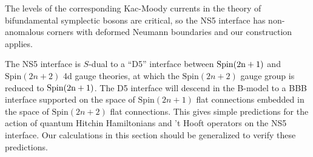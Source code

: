 \documentclass[11pt,a4paper]{article}
\begin{document}
The levels of the corresponding Kac-Moody currents in the theory of bifundamental symplectic bosons are critical, so the NS5 interface 
has non-anomalous corners with deformed Neumann boundaries and our construction applies. 

The NS5 interface is $S$-dual to a ``D5'' interface between $\mathrm{{\mathrm{Spin}}(2n+1)}$ and $\mathrm{Spin}(2n+2)$ 4d gauge theories,
at which the $\mathrm{Spin}(2n+2)$ gauge group is reduced to $\mathrm{{\mathrm{Spin}}(2n+1)}$. The D5 interface will descend in the B-model to a BBB interface supported on the space of $\mathrm{Spin}(2n+1)$ flat connections embedded in the space of $\mathrm{Spin}(2n+2)$ flat connections. This gives simple predictions for the action of quantum Hitchin Hamiltonians and 't Hooft operators on the NS5 interface. 
Our calculations in this section should be generalized to verify these predictions. 
\end{document}

